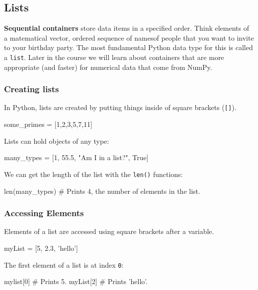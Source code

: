 \documentclass[12pt]{article} \newif\ifsolution\solutiontrue %
\begin{document}
\subsection{Lists}\label{lists}

\textbf{Sequential containers} store data items in a specified order.
Think elements of a matematical vector, ordered sequence of namesof people that you want to
invite to your birthday party. The most fundamental Python data type for
this is called a \texttt{list}. Later in the course we will learn about
containers that are more appropriate (and faster) for numerical data
that come from NumPy.

\subsubsection{Creating lists}\label{creating-lists}

In Python, lists are created by putting things inside of square brackets
(\texttt{{[}{]}}).

\begin{python}
some_primes = [1,2,3,5,7,11]
\end{python}

Lists can hold objects of any type:

\begin{python}
many_types = [1, 55.5, "Am I in a list?", True]
\end{python}

We can get the length of the list with the \texttt{len()} functions:

\begin{python}
len(many_types)  # Prints 4, the number of elements in the list.
\end{python}

\subsubsection{Accessing Elements}\label{accessing-elements}

Elements of a list are accessed using square brackets after a variable.

\begin{python}
myList = [5, 2.3, 'hello']
\end{python}

The first element of a list is at index \texttt{0}:

\begin{python}
mylist[0]  # Prints 5.
myList[2]  # Prints 'hello'.
\end{python}
\end{document}
